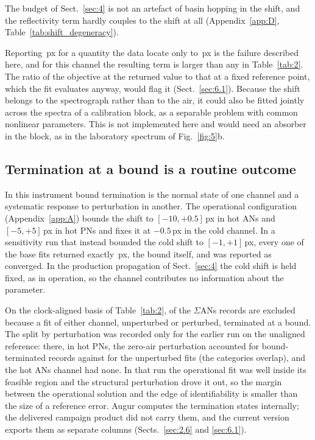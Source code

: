 The budget of Sect.~\ref{sec:4} is not an artefact of basin hopping in the shift, and the reflectivity term hardly couples to
the shift at all (Appendix~\ref{app:D}, Table~\ref{tab:shift_degeneracy}).

Reporting \,px for a quantity the data locate only to \,px is the failure described here, and
for this channel the resulting term is larger than any in Table~\ref{tab:2}. The ratio of the objective at the returned
value to that at a fixed reference point, which the fit evaluates anyway, would flag it (Sect.~\ref{sec:6.1}). Because
the shift belongs to the spectrograph rather than to the air, it could also be fitted jointly across the spectra of a
calibration block, as a separable problem with common nonlinear parameters. This is not implemented here and would
need an absorber in the block, as in the laboratory spectrum of Fig.~\ref{fig:5}b.

\subsection{Termination at a bound is a routine outcome}
\label{sec:5.2}

In this instrument bound termination is the normal state of one channel and a systematic response to perturbation in
another. The operational configuration (Appendix~\ref{app:A}) bounds the shift to $[-10, +0.5]$\,px in hot ANs and
$[-5, +5]$\,px in hot PNs and fixes it at $-0.5$\,px in the cold channel. In a sensitivity run that instead bounded the
cold shift to $[-1, +1]$\,px, every one of the  base fits returned exactly \,px, the bound itself, and was
reported as converged. In the production propagation of Sect.~\ref{sec:4} the cold shift is held fixed, as in operation,
so the channel contributes no information about the parameter.

On the clock-aligned basis of Table~\ref{tab:2},  of the  $\Sigma$ANs records are excluded because a fit of
either channel, unperturbed or perturbed, terminated at a bound. The split by perturbation was recorded only for the
earlier run on the unaligned reference: there, in hot PNs, the zero-air perturbation accounted for 
bound-terminated records against  for the unperturbed fits (the categories overlap), and the hot ANs channel had
none. In that run the operational fit was well inside its feasible region and the structural perturbation drove it
out, so the margin between the operational solution and the edge of identifiability is smaller than the size of a
reference error. Augur computes the termination states internally; the delivered campaign product did not carry them,
and the current version exports them as separate columns (Sects.~\ref{sec:2.6} and \ref{sec:6.1}).

